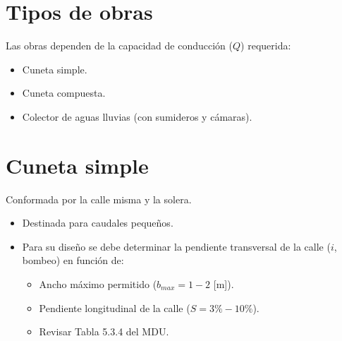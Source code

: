 \section{Tipos de obras}
Las obras dependen de la capacidad de conducción ($Q$) requerida:
\begin{itemize}
  \item Cuneta simple.
  \item Cuneta compuesta.
  \item Colector de aguas lluvias (con sumideros y cámaras).
\end{itemize}

\newcommand{\seccioncuneta}[1]{%
\begin{tikzpicture}[font=\small]
  \fill[gray!55] (0,0) rectangle (0.3,1.7);
  \ifnum#1=1
    \fill[gray!40] (0.3,0) -- (0.3,0.1) -- (1.8,0.9) -- (5.5,1.4) -- (6.3,1.25) -- (6.3,0) -- cycle;
    \fill[aguaclara] (0.3,0.1) -- (0.3,1.1) -- (3.5,1.1) -- (1.8,0.9) -- cycle;
    \draw (0.3,0.1) -- (1.8,0.9) -- (5.5,1.4) -- (6.3,1.25);
    \draw[dashed] (1.8,0.9) -- (5.8,0.9) (1.8,-0.2) -- (1.8,0.9);
    \draw[cota] (0.3,-0.1) -- (1.8,-0.1) node[midway,below]{$w$};
    \node at (1.3,0.3) {$i_1$}; \node at (4.9,1.1) {$i_2$};
    \draw[cota] (0.3,1.35) -- (3.5,1.35) node[midway,above]{$b$};
  \else
    \fill[gray!40] (0.3,0) -- (0.3,0.4) -- (5.5,1.2) -- (6.3,1.05) -- (6.3,0) -- cycle;
    \fill[aguaclara] (0.3,0.4) -- (0.3,0.85) -- (3.2,0.85) -- cycle;
    \draw (0.3,0.4) -- (5.5,1.2) -- (6.3,1.05);
    \draw[dashed] (0.3,0.4) -- (5.8,0.4);
    \node at (4.9,0.6) {$i$};
    \draw[cota] (0.3,1.1) -- (3.2,1.1) node[midway,above]{$b$};
    \draw[cota] (0.1,0.4) -- (0.1,0.85) node[midway,left]{$y$};
    \draw[cota] (-0.4,0.4) -- (-0.4,1.7) node[midway,left]{$h_s$};
  \fi
  \draw[<-] (5.5,1.45) -- (5.9,1.9) node[above,azulusm]{Bombeo};
\end{tikzpicture}}

\section{Cuneta simple}
Conformada por la calle misma y la solera.
\begin{itemize}
  \item Destinada para caudales pequeños.
  \item Para su diseño se debe determinar la pendiente transversal de la
        calle ($i$, bombeo) en función de:
  \begin{itemize}
    \item Ancho máximo permitido ($b_{max}=1-2$ [m]).
    \item Pendiente longitudinal de la calle ($S=3\%-10\%$).
    \item Revisar Tabla 5.3.4 del MDU.
  \end{itemize}
\end{itemize}

